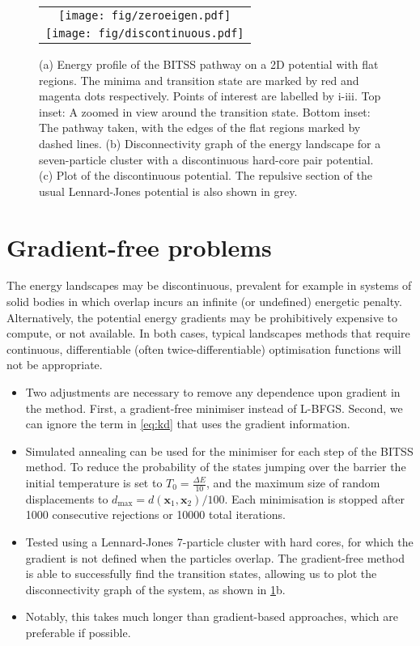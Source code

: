 \documentclass[aps,twocolumn]{revtex4}
\begin{document}
\begin{figure}[htb]
  \centering
  \begin{tabular}[b]{c}
    \texttt{[image: fig/zeroeigen.pdf]}\\
    \texttt{[image: fig/discontinuous.pdf]}
  \end{tabular}
  \caption{
    (a) Energy profile of the BITSS pathway on a 2D potential with flat regions.
        The minima and transition state are marked by red and magenta dots respectively.
        Points of interest are labelled by i-iii.
        Top inset: A zoomed in view around the transition state.
        Bottom inset: The pathway taken, with the edges of the flat regions marked by dashed lines.
    (b) Disconnectivity graph of the energy landscape for a seven-particle cluster with a discontinuous hard-core pair potential.
    (c) Plot of the discontinuous potential.
        The repulsive section of the usual Lennard-Jones potential is also shown in grey.
  }
  \label{fig:flatdiscontinuous}
\end{figure}


\section{Gradient-free problems}
The energy landscapes may be discontinuous, prevalent for example in systems of solid bodies in which overlap incurs an infinite (or undefined) energetic penalty.
Alternatively, the potential energy gradients may be prohibitively expensive to compute, or not available.
In both cases, typical landscapes methods that require continuous, differentiable (often twice-differentiable) optimisation functions will not be appropriate.

\begin{itemize}
\item
Two adjustments are necessary to remove any dependence upon gradient in the method.
First, a gradient-free minimiser instead of L-BFGS.
Second, we can ignore the term in \cref{eq:kd} that uses the gradient information.
\item
Simulated annealing can be used for the minimiser for each step of the BITSS method.
To reduce the probability of the states jumping over the barrier the initial temperature is set to $T_0 = \frac{\Delta E}{10}$, and the maximum size of random displacements to $d_\text{max} = d(\bm{x}_1, \bm{x}_2) / 100$.
Each minimisation is stopped after 1000 consecutive rejections or 10000 total iterations.
\item
Tested using a Lennard-Jones 7-particle cluster with hard cores, for which the gradient is not defined when the particles overlap.
The gradient-free method is able to successfully find the transition states, allowing us to plot the disconnectivity graph of the system, as shown in \cref{fig:flatdiscontinuous}b.
\item
Notably, this takes much longer than gradient-based approaches, which are preferable if possible.
\end{itemize}
\end{document}
